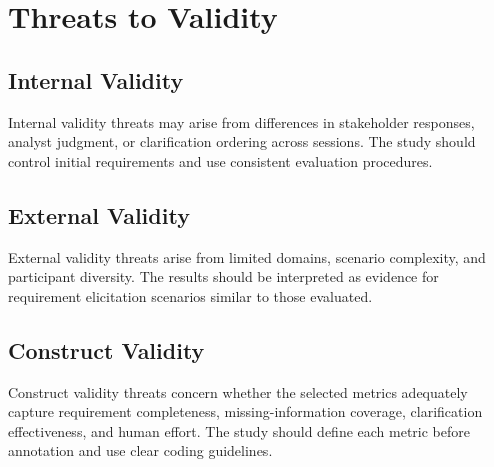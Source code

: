 \section{Threats to Validity}
\label{threats}

\subsection{Internal Validity}
Internal validity threats may arise from differences in stakeholder responses, analyst judgment, or clarification ordering across sessions.
The study should control initial requirements and use consistent evaluation procedures.

\subsection{External Validity}
External validity threats arise from limited domains, scenario complexity, and participant diversity.
The results should be interpreted as evidence for requirement elicitation scenarios similar to those evaluated.

\subsection{Construct Validity}
Construct validity threats concern whether the selected metrics adequately capture requirement completeness, missing-information coverage, clarification effectiveness, and human effort.
The study should define each metric before annotation and use clear coding guidelines.
